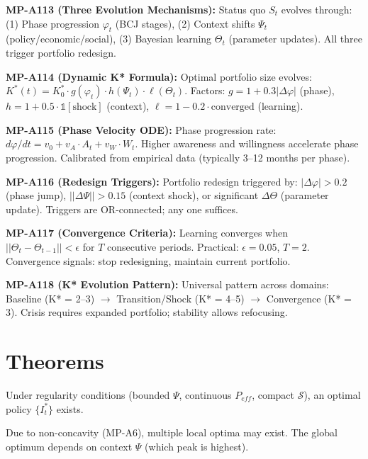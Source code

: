 \begin{tcolorbox}[colback=gray!5!white, colframe=gray!75!black,
    title=\textbf{MP Axioms}]
\textbf{MP-A113 (Three Evolution Mechanisms):} Status quo $S_t$ evolves through: (1) Phase progression $\varphi_t$ (BCJ stages), (2) Context shifts $\Psi_t$ (policy/economic/social), (3) Bayesian learning $\Theta_t$ (parameter updates). All three trigger portfolio redesign.

\textbf{MP-A114 (Dynamic K* Formula):} Optimal portfolio size evolves: $K^*(t) = K^*_0 \cdot g(\varphi_t) \cdot h(\Psi_t) \cdot \ell(\Theta_t)$. Factors: $g = 1 + 0.3|\Delta\varphi|$ (phase), $h = 1 + 0.5 \cdot \mathbb{1}[\text{shock}]$ (context), $\ell = 1 - 0.2 \cdot \text{converged}$ (learning).

\textbf{MP-A115 (Phase Velocity ODE):} Phase progression rate: $d\varphi/dt = v_0 + v_A \cdot A_t + v_W \cdot W_t$. Higher awareness and willingness accelerate phase progression. Calibrated from empirical data (typically 3--12 months per phase).

\textbf{MP-A116 (Redesign Triggers):} Portfolio redesign triggered by: $|\Delta\varphi| > 0.2$ (phase jump), $||\Delta\Psi|| > 0.15$ (context shock), or significant $\Delta\Theta$ (parameter update). Triggers are OR-connected; any one suffices.

\textbf{MP-A117 (Convergence Criteria):} Learning converges when $||\Theta_t - \Theta_{t-1}|| < \epsilon$ for $T$ consecutive periods. Practical: $\epsilon = 0.05$, $T = 2$. Convergence signals: stop redesigning, maintain current portfolio.

\textbf{MP-A118 (K* Evolution Pattern):} Universal pattern across domains: Baseline (K* = 2--3) $\to$ Transition/Shock (K* = 4--5) $\to$ Convergence (K* = 3). Crisis requires expanded portfolio; stability allows refocusing.

\end{tcolorbox}

\section{Theorems}
\label{sec:mp-theorems}

\begin{theorem}[MP-T1: Existence]
Under regularity conditions (bounded $\Psi$, continuous $P_{eff}$, compact $\mathcal{S}$),
an optimal policy $\{I^*_t\}$ exists.
\end{theorem}

\begin{theorem}
Due to non-concavity (MP-A6), multiple local optima may exist. The global optimum
depends on context $\Psi$ (which peak is highest).
\end{theorem}

